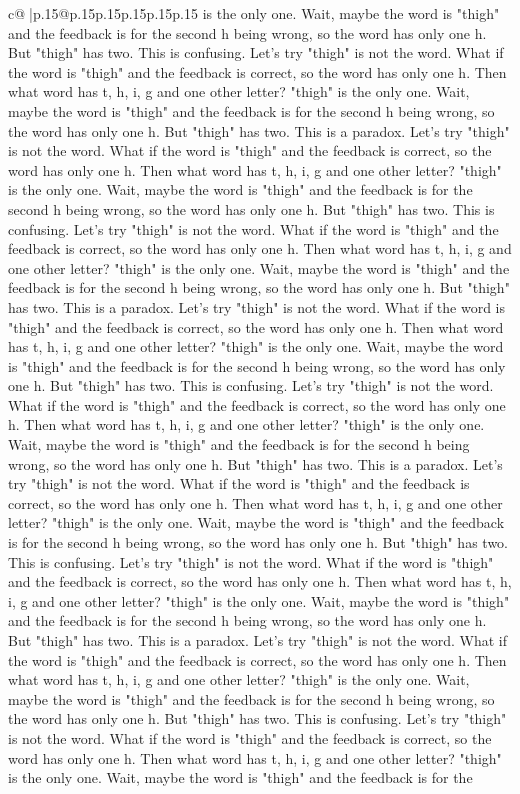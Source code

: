 \documentclass{article}
\begin{document}
{\begin{supertabular}{c@{$\;$}|p{.15\linewidth}@{}p{.15\linewidth}p{.15\linewidth}p{.15\linewidth}p{.15\linewidth}p{.15\linewidth}}
{{{is the only one. Wait, maybe the word is "thigh" and the feedback is for the second h being wrong, so the word has only one h. But "thigh" has two. This is confusing. Let's try "thigh" is not the word. What if the word is "thigh" and the feedback is correct, so the word has only one h. Then what word has t, h, i, g and one other letter? "thigh" is the only one. Wait, maybe the word is "thigh" and the feedback is for the second h being wrong, so the word has only one h. But "thigh" has two. This is a paradox. Let's try "thigh" is not the word. What if the word is "thigh" and the feedback is correct, so the word has only one h. Then what word has t, h, i, g and one other letter? "thigh" is the only one. Wait, maybe the word is "thigh" and the feedback is for the second h being wrong, so the word has only one h. But "thigh" has two. This is confusing. Let's try "thigh" is not the word. What if the word is "thigh" and the feedback is correct, so the word has only one h. Then what word has t, h, i, g and one other letter? "thigh" is the only one. Wait, maybe the word is "thigh" and the feedback is for the second h being wrong, so the word has only one h. But "thigh" has two. This is a paradox. Let's try "thigh" is not the word. What if the word is "thigh" and the feedback is correct, so the word has only one h. Then what word has t, h, i, g and one other letter? "thigh" is the only one. Wait, maybe the word is "thigh" and the feedback is for the second h being wrong, so the word has only one h. But "thigh" has two. This is confusing. Let's try "thigh" is not the word. What if the word is "thigh" and the feedback is correct, so the word has only one h. Then what word has t, h, i, g and one other letter? "thigh" is the only one. Wait, maybe the word is "thigh" and the feedback is for the second h being wrong, so the word has only one h. But "thigh" has two. This is a paradox. Let's try "thigh" is not the word. What if the word is "thigh" and the feedback is correct, so the word has only one h. Then what word has t, h, i, g and one other letter? "thigh" is the only one. Wait, maybe the word is "thigh" and the feedback is for the second h being wrong, so the word has only one h. But "thigh" has two. This is confusing. Let's try "thigh" is not the word. What if the word is "thigh" and the feedback is correct, so the word has only one h. Then what word has t, h, i, g and one other letter? "thigh" is the only one. Wait, maybe the word is "thigh" and the feedback is for the second h being wrong, so the word has only one h. But "thigh" has two. This is a paradox. Let's try "thigh" is not the word. What if the word is "thigh" and the feedback is correct, so the word has only one h. Then what word has t, h, i, g and one other letter? "thigh" is the only one. Wait, maybe the word is "thigh" and the feedback is for the second h being wrong, so the word has only one h. But "thigh" has two. This is confusing. Let's try "thigh" is not the word. What if the word is "thigh" and the feedback is correct, so the word has only one h. Then what word has t, h, i, g and one other letter? "thigh" is the only one. Wait, maybe the word is "thigh" and the feedback is for the }}}
\end{supertabular}}
\end{document}
